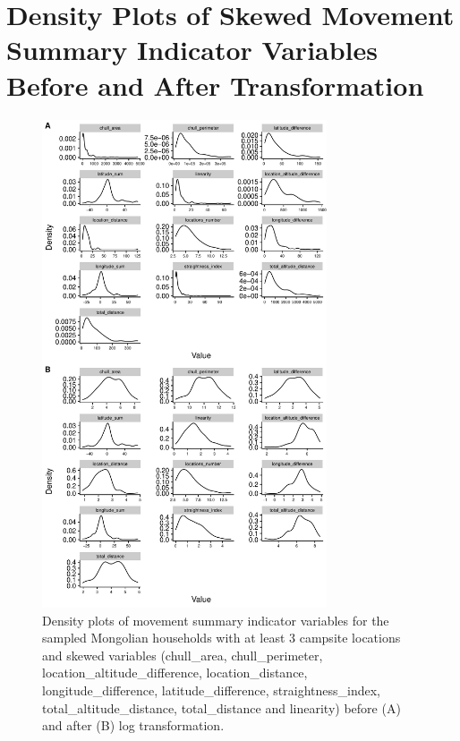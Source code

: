 \documentclass[]{elsarticle} %
\begin{document}
\hypertarget{density-plots-of-skewed-movement-summary-indicator-variables-before-and-after-transformation}{%
\section{Density Plots of Skewed Movement Summary Indicator Variables
Before and After
Transformation}\label{density-plots-of-skewed-movement-summary-indicator-variables-before-and-after-transformation}}

\begin{figure}[H]

{\centering \includegraphics[width=0.75\textwidth]{../figures/appendix-si-density-plot-1} 

}

\caption{Density plots of movement summary indicator variables for the sampled Mongolian households with at least 3 campsite locations and skewed variables (chull\_area, chull\_perimeter, location\_altitude\_difference, location\_distance, longitude\_difference, latitude\_difference, straightness\_index, total\_altitude\_distance, total\_distance and linearity) before (A) and after (B) log transformation.}\label{fig:appendix-si-density-plot}
\end{figure}
\end{document}
